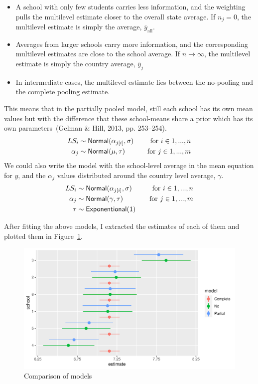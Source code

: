 \documentclass[a4, 12pt]{article}
\begin{document}
\begin{itemize}
\item A school with only few students carries less information, and the weighting pulls the multilevel estimate closer to the overall state average. If $n_j=0$, the multilevel estimate is simply the average, $\bar y_{\mathrm {all}}$.
\item Averages from larger schools carry more information, and the corresponding multilevel estimates are close to the school average. If $n \rightarrow \infty$, the multilevel estimate is simply the country average, $\bar y_j$
\item In intermediate cases, the multilevel estimate lies between the no-pooling and the complete pooling estimate.
\end{itemize}

This means that in the partially pooled model, still each school has its own mean values but with the difference that these school-means share a prior which has its own parameters~(Gelman \& Hill, 2013, pp. 253--254).
\begin{align*}
LS_i & \sim {\sf Normal} (\alpha_{j[i]}, \sigma) & \quad \text{for } i \in 1,...,n \\
\alpha_{j} & \sim {\sf Normal} (\mu, \tau) & \quad \text{for } j \in 1,...,m
\end{align*}
We could also write the model with the school-level average in the mean equation for \(y\), and the \(\alpha_j\) values distributed around the country level average, \(\gamma\).
\begin{align*}
LS_i & \sim {\sf Normal} (\alpha_{j[i]}, \sigma) & \quad \text{for } i \in 1,...,n \\
\alpha_{j} & \sim {\sf Normal} (\gamma, \tau) & \quad \text{for } j \in 1,...,m \\
\tau & \sim {\sf Exponentional(1)}
\end{align*}

After fitting the above models, I extracted the estimates of each of them and plotted them in Figure~\ref{fig:compare-models}.

\begin{figure}[H]

{\centering \includegraphics[width=0.8\linewidth,]{../figures/compare_models} 

}

\caption{Comparison of models}\label{fig:compare-models}
\end{figure}
\end{document}
